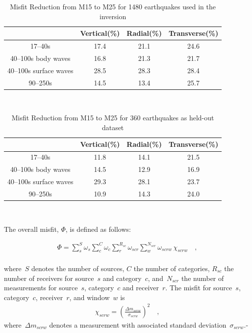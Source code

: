 \documentclass[extra,mreferee]{gji}
\begin{document}
\begin{table}[!htb]
\caption{Misfit Reduction from M15 to M25 for 1480 earthquakes used in the inversion}
\label{tab:category}
\begin{tabular}{|c|c|c|c|}
\hline
~          &  Vertical(\%) & Radial(\%) &  Transverse(\%) \\
\hline
17--40s                &   17.4   &       21.1 &       24.6 \\
40--100s body waves    &   16.8   &       21.3 &       21.7 \\
40--100s surface waves &   28.5   &       28.3 &       28.4 \\
90--250s               &     14.5 &       13.4 &       25.7 \\
\hline
\end{tabular}\\
\label{table:categories}
\end{table}



\begin{table}[!htb]
\caption{Misfit Reduction from M15 to M25 for 360 earthquakes as held-out dataset}
\label{tab:category}
\begin{tabular}{|c|c|c|c|}
\hline
~          &  Vertical(\%) & Radial(\%) &  Transverse(\%) \\
\hline
17--40s                &          11.8 &       14.1 &       21.5 \\
40--100s body waves    &          14.5 &       12.9 &       16.9 \\
40--100s surface waves &          29.3 &       28.1 &       23.7 \\
90--250s               &          10.9 &       14.3 &       24.0 \\
\hline
\end{tabular}\\
\label{table:categories}
\end{table}

The overall misfit, $\Phi$, is defined as follows:

\begin{align}
\label{eq:misfit}
\Phi = \sum_{s}^{S} \omega_s \sum_{c}^{C} \omega_{c} \sum_{r}^{R_{sc}} \omega_{scr} \sum_{w}^{N_{scr}} \omega_{scrw}\, \chi_{scrw}
\quad ,
\end{align}\\
where~$S$ denotes the number of sources, $C$ the number of categories,
$R_{sc}$ the number of receivers for source~$s$ and category~$c$, and~$N_{scr}$ the number of measurements for source~$s$,
category~$c$ and receiver~$r$.
The misfit for source~$s$,
category~$c$, receiver~$r$, and window~$w$ is
\begin{align}
\chi_{scrw} = \left(\frac{\Delta m_{scrw}}{\sigma_{scrw}}\right)^2
\quad ,
\end{align}
where~$\Delta m_{scrw}$ denotes a measurement with associated standard deviation~$\sigma_{scrw}$.-
\end{document}
